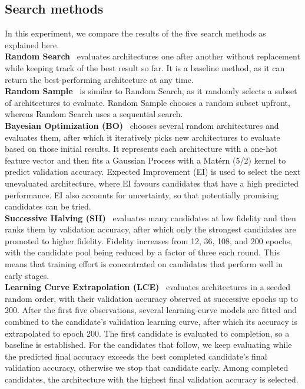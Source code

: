 \documentclass[12pt]{article}
\begin{document}
\subsection{Search methods}
In this experiment, we compare the results of the five search methods as explained here. \\
\textbf{Random Search}~\cite{DBLP:journals/corr/abs-1902-07638} evaluates architectures one after another without replacement while keeping track of the best result so far. It is a baseline method, as it can return the best-performing architecture at any time. \\
\textbf{Random Sample}~\cite{li2021improving} is similar to Random Search, as it randomly selects a subset of architectures to evaluate. Random Sample chooses a random subset upfront, whereas Random Search uses a sequential search. \\
\textbf{Bayesian Optimization (BO)}~\cite{kandasamy2019neuralarchitecturesearchbayesian} chooses several random architectures and evaluates them, after which it iteratively picks new architectures to evaluate based on those initial results. It represents each architecture with a one-hot feature vector and then fits a Gaussian Process with a Matérn (5/2) kernel to predict validation accuracy. Expected Improvement (EI) is used to select the next unevaluated architecture, where EI favours candidates that have a high predicted performance. EI also accounts for uncertainty, so that potentially promising candidates can be tried.  \\
\textbf{Successive Halving (SH)}~\cite{zhang-duh-2024-best} evaluates many candidates at low fidelity and then ranks them by validation accuracy, after which only the strongest candidates are promoted to higher fidelity. Fidelity increases from 12, 36, 108, and 200 epochs, with the candidate pool being reduced by a factor of three each round. This means that training effort is concentrated on candidates that perform well in early stages. \\
\textbf{Learning Curve Extrapolation (LCE)}~\cite{domhan2015speeding} evaluates architectures in a seeded random order, with their validation accuracy observed at successive epochs up to 200. After the first five observations, several learning-curve models are fitted and combined to the candidate's validation learning curve, after which its accuracy is extrapolated to epoch 200. The first candidate is evaluated to completion, so a baseline is established. For the candidates that follow, we keep evaluating while the predicted final accuracy exceeds the best completed candidate's final validation accuracy, otherwise we stop that candidate early. Among completed candidates, the architecture with the highest final validation accuracy is selected.
\end{document}

